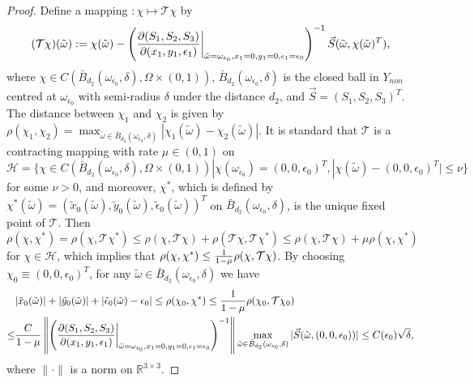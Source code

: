 \documentclass[1 [leqno, 11pt]{amsart}
\numberwithin{equation}{section}
\let\ep=\epsilon
\begin{document}
\begin{CJK*}{GBK}{song}
\begin{proof}
Define a mapping $:\chi \mapsto \mathcal{T}\chi$ by
\begin{align*}
(\mathcal{T}\chi)(\tilde \omega):=\chi(\tilde \omega)-\left({\partial(S_1,S_2,S_3)\over \partial(x_1,y_1,\ep_1)}\bigg|_{\tilde \omega=\omega_{\ep_0},x_1=0,y_1=0,\ep_1=\ep_0}\right)^{-1}\vec{S}(\tilde \omega,\chi(\tilde \omega)^T),
\end{align*}
where $\chi\in C(\bar{B}_{d_2}(\omega_{\ep_0},\delta),\Omega\times (0,1))$, $\bar{B}_{d_2}(\omega_{\ep_0},\delta)$ is the closed ball in $Y_{non}$ centred at $\omega_{\ep_0}$ with semi-radius $\delta$ under the distance $d_2$, and  $\vec{S}=(S_1,S_2,S_3)^T$. The distance between $\chi_1$ and $\chi_2$ is given by  $\rho(\chi_1,\chi_2)=\max_{\tilde \omega\in\bar{B}_{d_2}(\omega_{\ep_0},\delta)}|\chi_1(\tilde \omega)-\chi_2(\tilde \omega)|.$
It is  standard that $\mathcal{T}$ is a contracting mapping with rate $\mu\in(0,1)$ on $\mathcal{H}=\{\chi\in C(\bar{B}_{d_2}(\omega_{\ep_0},\delta),\Omega\times (0,1))|\chi(\omega_{\ep_0})=(0,0,\ep_0)^T,|\chi(\tilde \omega)-(0,0,\ep_0)^T|\leq\nu\}$ for some $\nu>0$, and moreover, $\chi^*$, which is defined by $\chi^*(\tilde \omega)=(\tilde x_0(\tilde \omega),\tilde y_0(\tilde \omega),\tilde \ep_0(\tilde \omega))^T$ on $\bar{B}_{d_2}(\omega_{\ep_0},\delta)$, is the unique fixed point of $\mathcal{T}$. Then $\rho(\chi,\chi^*)= \rho(\chi,\mathcal{T}\chi^*)\leq \rho(\chi,\mathcal{T}\chi)+\rho(\mathcal{T}\chi,\mathcal{T}\chi^*)\leq \rho(\chi,\mathcal{T}\chi)+\mu\rho(\chi,\chi^*)$ for $\chi\in\mathcal{H}$, which implies that $\rho(\chi,\chi^*)\leq {1\over 1-\mu}\rho(\chi,\mathcal{T}\chi)$. By  choosing $\chi_0\equiv(0,0,\ep_0)^T$,  for any $\tilde \omega\in\bar{B}_{d_2}(\omega_{\ep_0},\delta)$ we have
\begin{align*}
&|\tilde x_0(\tilde \omega)|+|\tilde y_0(\tilde \omega)|+|\tilde \ep_0(\tilde \omega)-\ep_0|\leq \rho(\chi_0,\chi^*)\leq {1\over 1-\mu}\rho(\chi_0,\mathcal{T}\chi_0)\\
\leq& {C\over 1-\mu}\left\|\left({\partial(S_1,S_2,S_3)\over \partial(x_1,y_1,\ep_1)}\bigg|_{\tilde \omega=\omega_{\ep_0},x_1=0,y_1=0,\ep_1=\ep_0}\right)^{-1}\right\|\max_{\tilde \omega\in\bar{B}_{d_2}(\omega_{\ep_0},\delta)}|\vec{S}(\tilde \omega,(0,0,\ep_0))|\leq C(\ep_0)\sqrt{\delta},
\end{align*}
where $\|\cdot\|$ is a norm on $\mathbb{R}^{3\times 3}$.


\end{proof}
\end{CJK*}
\end{document}
